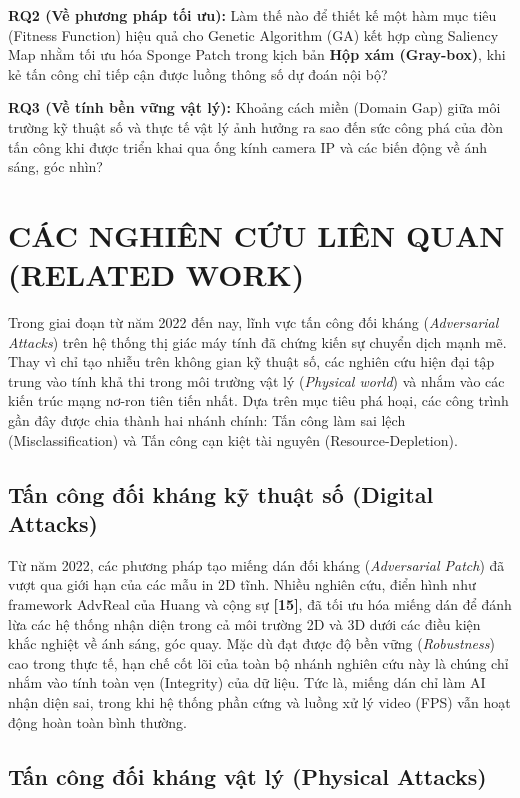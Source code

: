 \documentclass[a4paper,fleqn]{cas-dc}
\begin{document}
\textbf{RQ2 (Về phương pháp tối ưu):} Làm thế nào để thiết kế một hàm
mục tiêu (Fitness Function) hiệu quả cho Genetic Algorithm (GA) kết hợp
cùng Saliency Map nhằm tối ưu hóa Sponge Patch trong kịch bản
\textbf{Hộp xám (Gray-box)}, khi kẻ tấn công chỉ tiếp cận được luồng
thông số dự đoán nội bộ?

\textbf{RQ3 (Về tính bền vững vật lý):} Khoảng cách miền (Domain Gap)
giữa môi trường kỹ thuật số và thực tế vật lý ảnh hưởng ra sao đến sức
công phá của đòn tấn công khi được triển khai qua ống kính camera IP và
các biến động về ánh sáng, góc nhìn?

\section{CÁC NGHIÊN CỨU LIÊN QUAN (RELATED WORK)}



Trong giai đoạn từ năm 2022 đến nay, lĩnh vực tấn công đối kháng
(\emph{Adversarial Attacks}) trên hệ thống thị giác máy tính đã chứng
kiến sự chuyển dịch mạnh mẽ. Thay vì chỉ tạo nhiễu trên không gian kỹ
thuật số, các nghiên cứu hiện đại tập trung vào tính khả thi trong môi
trường vật lý (\emph{Physical world}) và nhắm vào các kiến trúc mạng
nơ-ron tiên tiến nhất. Dựa trên mục tiêu phá hoại, các công trình gần
đây được chia thành hai nhánh chính: Tấn công làm sai lệch
(Misclassification) và Tấn công cạn kiệt tài nguyên
(Resource-Depletion).

\subsection{Tấn công đối kháng kỹ thuật số (Digital Attacks)}



Từ năm 2022, các phương pháp tạo miếng dán đối kháng (\emph{Adversarial
Patch}) đã vượt qua giới hạn của các mẫu in 2D tĩnh. Nhiều nghiên cứu,
điển hình như framework AdvReal của Huang và cộng sự \textbf{{[}15{]}},
đã tối ưu hóa miếng dán để đánh lừa các hệ thống nhận diện trong cả môi
trường 2D và 3D dưới các điều kiện khắc nghiệt về ánh sáng, góc quay.
Mặc dù đạt được độ bền vững (\emph{Robustness}) cao trong thực tế, hạn
chế cốt lõi của toàn bộ nhánh nghiên cứu này là chúng chỉ nhắm vào tính
toàn vẹn (Integrity) của dữ liệu. Tức là, miếng dán chỉ làm AI nhận diện
sai, trong khi hệ thống phần cứng và luồng xử lý video (FPS) vẫn hoạt
động hoàn toàn bình thường.

\subsection{Tấn công đối kháng vật lý (Physical Attacks)}
\end{document}
